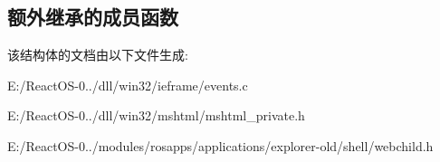 \subsection*{额外继承的成员函数}


该结构体的文档由以下文件生成\+:\begin{DoxyCompactItemize}
\item 
E\+:/\+React\+O\+S-\/0../dll/win32/ieframe/events.\+c\item 
E\+:/\+React\+O\+S-\/0../dll/win32/mshtml/mshtml\+\_\+private.\+h\item 
E\+:/\+React\+O\+S-\/0../modules/rosapps/applications/explorer-\/old/shell/webchild.\+h\end{DoxyCompactItemize}
